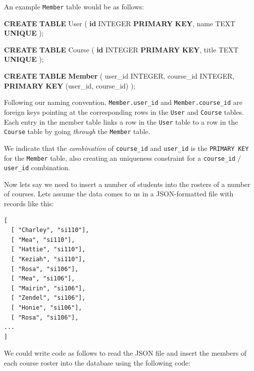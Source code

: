 \documentclass[10pt,]{book}
\newenvironment{Shaded}{}{}
\newcommand{\DataTypeTok}[1]{\textcolor[rgb]{0.56,0.13,0.00}{#1}}
\newcommand{\FunctionTok}[1]{\textcolor[rgb]{0.02,0.16,0.49}{#1}}
\newcommand{\KeywordTok}[1]{\textcolor[rgb]{0.00,0.44,0.13}{\textbf{#1}}}
\newcommand{\NormalTok}[1]{#1}
\begin{document}
An example \texttt{Member} table would be as follows:

\begin{Shaded}
\begin{Highlighting}[]
\KeywordTok{CREATE} \KeywordTok{TABLE} \FunctionTok{User}\NormalTok{ (}
    \KeywordTok{id}     \DataTypeTok{INTEGER} \KeywordTok{PRIMARY} \KeywordTok{KEY}\NormalTok{,}
\NormalTok{    name   TEXT }\KeywordTok{UNIQUE}
\NormalTok{);}

\KeywordTok{CREATE} \KeywordTok{TABLE}\NormalTok{ Course (}
    \KeywordTok{id}     \DataTypeTok{INTEGER} \KeywordTok{PRIMARY} \KeywordTok{KEY}\NormalTok{,}
\NormalTok{    title  TEXT }\KeywordTok{UNIQUE}
\NormalTok{);}

\KeywordTok{CREATE} \KeywordTok{TABLE} \KeywordTok{Member}\NormalTok{ (}
\NormalTok{    user\_id     }\DataTypeTok{INTEGER}\NormalTok{,}
\NormalTok{    course\_id   }\DataTypeTok{INTEGER}\NormalTok{,}
    \KeywordTok{PRIMARY} \KeywordTok{KEY}\NormalTok{ (user\_id, course\_id)}
\NormalTok{);}
\end{Highlighting}
\end{Shaded}

Following our naming convention, \texttt{Member.user\_id} and
\texttt{Member.course\_id} are foreign keys pointing at the
corresponding rows in the \texttt{User} and \texttt{Course} tables. Each
entry in the member table links a row in the \texttt{User} table to a
row in the \texttt{Course} table by going \emph{through} the
\texttt{Member} table.

 We indicate that the \emph{combination} of
\texttt{course\_id} and \texttt{user\_id} is the \texttt{PRIMARY\ KEY}
for the \texttt{Member} table, also creating an uniqueness constraint
for a \texttt{course\_id} / \texttt{user\_id} combination.

Now lets say we need to insert a number of students into the rosters of
a number of courses. Lets assume the data comes to us in a
JSON-formatted file with records like this:

{\small
\begin{verbatim}
[
  [ "Charley", "si110"],
  [ "Mea", "si110"],
  [ "Hattie", "si110"],
  [ "Keziah", "si110"],
  [ "Rosa", "si106"],
  [ "Mea", "si106"],
  [ "Mairin", "si106"],
  [ "Zendel", "si106"],
  [ "Honie", "si106"],
  [ "Rosa", "si106"],
...
]
\end{verbatim}
}

 We could write code as follows to read the JSON file
and insert the members of each course roster into the database using the
following code:
\end{document}

